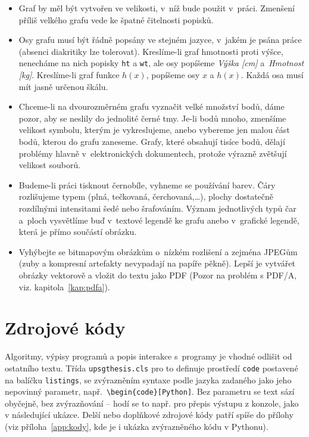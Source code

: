 \begin{itemize}
\item Graf by měl být vytvořen ve velikosti, v~níž bude použit
  v~práci. Zmenšení příliš velkého grafu vede ke špatné čitelnosti
  popisků.
\item Osy grafu musí být řádně popsány ve stejném jazyce, v~jakém je
  psána práce (absenci diakritiky lze tolerovat). Kreslíme-li graf
  hmotnosti proti výšce, nenecháme na nich popisky \texttt{ht} a
  \texttt{wt}, ale osy popíšeme \emph{Výška [cm]} a~\emph{Hmotnost
    [kg]}. Kreslíme-li graf funkce $h(x)$, popíšeme osy $x$ a $h(x)$.
  Každá osa musí mít jasně určenou škálu.
\item Chceme-li na dvourozměrném grafu vyznačit velké množství bodů,
  dáme pozor, aby se neslily do jednolité černé tmy. Je-li bodů mnoho,
  zmenšíme velikost symbolu, kterým je vykreslujeme, anebo vybereme
  jen malou část bodů, kterou do grafu zaneseme. Grafy, které obsahují
  tisíce bodů, dělají problémy hlavně v~elektronických dokumentech,
  protože výrazně zvětšují velikost souborů.
\item Budeme-li práci tisknout černobíle, vyhneme se používání barev.
  Čáry roz\-li\-šu\-je\-me typem (plná, tečkovaná, čerchovaná,\ldots), plochy
  dostatečně roz\-díl\-ný\-mi intensitami šedé nebo šrafováním. Význam
  jednotlivých typů čar a~ploch vysvětlíme buď v~textové legendě ke
  grafu anebo v~grafické legendě, která je přímo součástí obrázku.
\item Vyhýbejte se bitmapovým obrázkům o~nízkém rozlišení a zejména
  JPEGům (zuby a kompresní artefakty nevypadají na papíře pěkně).
  Lepší je vytvářet obrázky vektorově a vložit do textu jako PDF (Pozor na problém s PDF/A, viz. kapitola~\ref{kap:pdfa}).
\end{itemize}


\section{Zdrojové kódy}
Algoritmy, výpisy programů a popis interakce s~programy je vhodné odlišit od ostatního textu. Třída \texttt{upsgthesis.cls} pro to definuje prostředí \texttt{code} postavené na balíčku \texttt{listings}, se zvýrazněním syntaxe podle jazyka zadaného jako jeho nepovinný parametr, např.\ \verb|\begin{code}[Python]|. Bez parametru se text sází obyčejně, bez zvýrazňování -- hodí se to např. pro přepis výstupu z konzole, jako v následující ukázce. Delší nebo doplňkové zdrojové kódy patří spíše do přílohy (viz příloha~\ref{app:kody}, kde je i ukázka zvýrazněného kódu v Pythonu).

